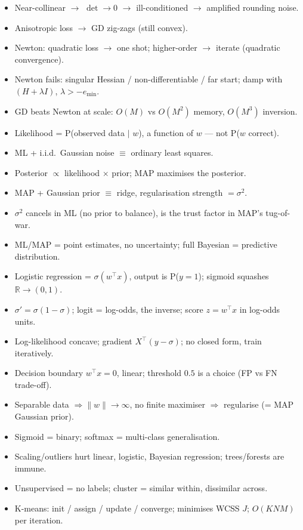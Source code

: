 \documentclass[11pt, a4paper]{article}
\begin{document}
\begin{tldrbox}
\begin{itemize}[leftmargin=*]
  \item Near-collinear $\to$ $\det\to0$ $\to$ ill-conditioned $\to$ amplified rounding noise.
  \item Anisotropic loss $\to$ GD zig-zags (still convex).
  \item Newton: quadratic loss $\to$ one shot; higher-order $\to$ iterate (quadratic convergence).
  \item Newton fails: singular Hessian / non-differentiable / far start; damp with $(H+\lambda I)$, $\lambda>-e_{\min}$.
  \item GD beats Newton at scale: $O(M)$ vs $O(M^2)$ memory, $O(M^3)$ inversion.
  \item Likelihood = P(observed data $\mid$ $w$), a function of $w$ — not P($w$ correct).
  \item ML + i.i.d.\ Gaussian noise $\equiv$ ordinary least squares.
  \item Posterior $\propto$ likelihood $\times$ prior; MAP maximises the posterior.
  \item MAP + Gaussian prior $\equiv$ ridge, regularisation strength $=\sigma^2$.
  \item $\sigma^2$ cancels in ML (no prior to balance), is the trust factor in MAP's tug-of-war.
  \item ML/MAP = point estimates, no uncertainty; full Bayesian = predictive distribution.
  \item Logistic regression = $\sigma(w^\top x)$, output is P($y{=}1$); sigmoid squashes $\mathbb R\to(0,1)$.
  \item $\sigma'=\sigma(1-\sigma)$; logit = log-odds, the inverse; score $z=w^\top x$ in log-odds units.
  \item Log-likelihood concave; gradient $X^\top(y-\sigma)$; no closed form, train iteratively.
  \item Decision boundary $w^\top x=0$, linear; threshold $0.5$ is a choice (FP vs FN trade-off).
  \item Separable data $\Rightarrow\|w\|\to\infty$, no finite maximiser $\Rightarrow$ regularise (= MAP Gaussian prior).
  \item Sigmoid = binary; softmax = multi-class generalisation.
  \item Scaling/outliers hurt linear, logistic, Bayesian regression; trees/forests are immune.
  \item Unsupervised = no labels; cluster = similar within, dissimilar across.
  \item K-means: init / assign / update / converge; minimises WCSS $J$; $O(KNM)$ per iteration.

\end{itemize}
\end{tldrbox}
\end{document}
